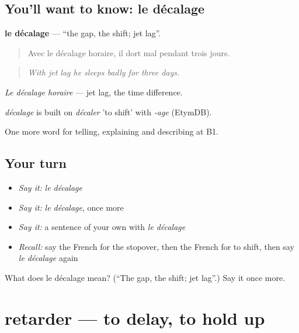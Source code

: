 \subsection*{You'll want to know: le décalage}
\textbf{le décalage} — \textquotedblleft{}the gap, the shift; jet lag\textquotedblright{}.

\begin{quote}
Avec le décalage horaire, il dort mal pendant trois jours.
\end{quote}

\begin{quote}
\emph{With jet lag he sleeps badly for three days.}
\end{quote}

\emph{Le décalage horaire} — jet lag, the time difference.

\begin{cousinweb}
\emph{décalage} is built on \emph{décaler} 'to shift' with \emph{-age} (EtymDB).
\end{cousinweb}

\begin{grammarlens}[title={What you've built}]
One more word for telling, explaining and describing at B1.
\end{grammarlens}

\subsection*{Your turn}
\begin{itemize}
\raggedright
  \item \emph{Say it:} \emph{le décalage}
  \item \emph{Say it:} \emph{le décalage}, once more
  \item \emph{Say it:} a sentence of your own with \emph{le décalage}
  \item \emph{Recall:} say the French for the stopover, then the French for to shift, then say \emph{le décalage} again
\end{itemize}

\begin{tcolorbox}[breakable,colback=teal!4,colframe=teal!35!black,title={Before you move on}]
What does le décalage mean? (\textquotedblleft{}The gap, the shift; jet lag\textquotedblright{}.) Say it once more.
\end{tcolorbox}
\section[retarder]{retarder — to delay, to hold up}

